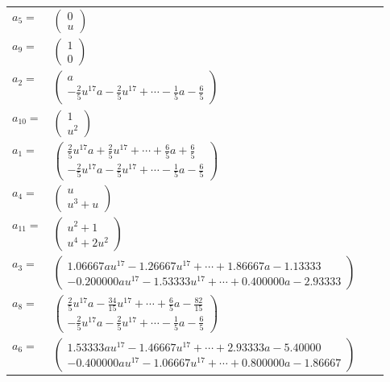\documentclass[1p]{elsarticle_modified}
\theoremstyle{definition}
\begin{document}
\begin{tabular}{m{7pt} m{180pt} m{7pt} m{180pt} }
\flushright $a_{5}=$&$\begin{pmatrix}0\\u\end{pmatrix}$ \\
\flushright $a_{9}=$&$\begin{pmatrix}1\\0\end{pmatrix}$ \\
\flushright $a_{2}=$&$\begin{pmatrix}a\\-\frac{2}{5} u^{17} a-\frac{2}{5} u^{17}+\cdots-\frac{1}{5} a-\frac{6}{5}\end{pmatrix}$ \\
\flushright $a_{10}=$&$\begin{pmatrix}1\\u^2\end{pmatrix}$ \\
\flushright $a_{1}=$&$\begin{pmatrix}\frac{2}{5} u^{17} a+\frac{2}{5} u^{17}+\cdots+\frac{6}{5} a+\frac{6}{5}\\-\frac{2}{5} u^{17} a-\frac{2}{5} u^{17}+\cdots-\frac{1}{5} a-\frac{6}{5}\end{pmatrix}$ \\
\flushright $a_{4}=$&$\begin{pmatrix}u\\u^3+u\end{pmatrix}$ \\
\flushright $a_{11}=$&$\begin{pmatrix}u^2+1\\u^4+2 u^2\end{pmatrix}$ \\
\flushright $a_{3}=$&$\begin{pmatrix}1.06667 a u^{17}-1.26667 u^{17}+\cdots+1.86667 a-1.13333\\-0.200000 a u^{17}-1.53333 u^{17}+\cdots+0.400000 a-2.93333\end{pmatrix}$ \\
\flushright $a_{8}=$&$\begin{pmatrix}\frac{2}{5} u^{17} a-\frac{34}{15} u^{17}+\cdots+\frac{6}{5} a-\frac{82}{15}\\-\frac{2}{5} u^{17} a-\frac{2}{5} u^{17}+\cdots-\frac{1}{5} a-\frac{6}{5}\end{pmatrix}$ \\
\flushright $a_{6}=$&$\begin{pmatrix}1.53333 a u^{17}-1.46667 u^{17}+\cdots+2.93333 a-5.40000\\-0.400000 a u^{17}-1.06667 u^{17}+\cdots+0.800000 a-1.86667\end{pmatrix}$ \\

\end{tabular}
\end{document}
